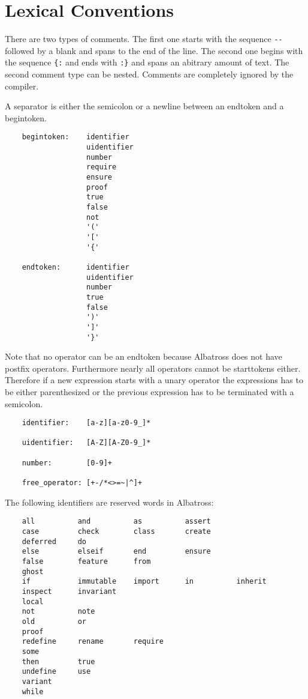 \section{Lexical Conventions} \label{lexconv}


There are two types of comments. The first one starts with the sequence
\lstinline!--! followed by a blank and spans to the end of the line. The
second one begins with the sequence \lstinline!{:! and ends with
  \lstinline!:}! and spans an abitrary amount of text. The second comment type
can be nested. Comments are completely ignored by the compiler.

\newcommand {\semicol}{\lstinline!;!}

A separator is either the semicolon or a newline between an endtoken and a
begintoken.

\begin{lstlisting}
    begintoken:    identifier
                   uidentifier
                   number
                   require
                   ensure
                   proof
                   true
                   false
                   not
                   '('
                   '['
                   '{'

    endtoken:      identifier
                   uidentifier
                   number
                   true
                   false
                   ')'
                   ']'
                   '}'
\end{lstlisting}
Note that no operator can be an endtoken because Albatross does not have
postfix operators. Furthermore nearly all operators cannot be starttokens
either. Therefore if a new expression starts with a unary operator the
expressions has to be either parenthesized or the previous expression has to
be terminated with a semicolon.

\begin{lstlisting}
    identifier:    [a-z][a-z0-9_]*

    uidentifier:   [A-Z][A-Z0-9_]*

    number:        [0-9]+

    free_operator: [+-/*<>=~|^]+
\end{lstlisting}

\noindent The following identifiers are reserved words in Albatross:
\begin{lstlisting}
    all          and          as          assert
    case         check        class       create
    deferred     do
    else         elseif       end         ensure
    false        feature      from
    ghost
    if           immutable    import      in          inherit
    inspect      invariant
    local
    not          note
    old          or
    proof
    redefine     rename       require
    some
    then         true
    undefine     use
    variant
    while
\end{lstlisting}


